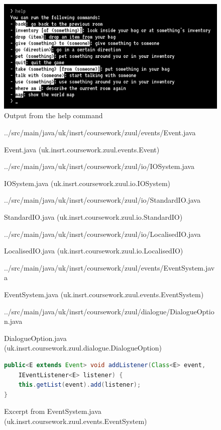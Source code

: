 \documentclass{article}
\begin{document}
    \begin{figure}
        \centering
        \includegraphics[width=\textwidth]{images/help-command.jpg}
        \caption{Output from the help command} \label{fig:help-command}
    \end{figure}
    \begin{figure}
        
        {../src/main/java/uk/insrt/coursework/zuul/events/Event.java}
        \caption{Event.java (uk.insrt.coursework.zuul.events.Event)} \label{fig:event}
    \end{figure}
    \begin{figure}
        
        {../src/main/java/uk/insrt/coursework/zuul/io/IOSystem.java}
        \caption{IOSystem.java (uk.insrt.coursework.zuul.io.IOSystem)} \label{fig:io-system}
    \end{figure}
    \begin{figure}
        
        {../src/main/java/uk/insrt/coursework/zuul/io/StandardIO.java}
        \caption{StandardIO.java (uk.insrt.coursework.zuul.io.StandardIO)} \label{fig:standard-io}
    \end{figure}
    \begin{figure}
        
        {../src/main/java/uk/insrt/coursework/zuul/io/LocalisedIO.java}
        \caption{LocalisedIO.java (uk.insrt.coursework.zuul.io.LocalisedIO)} \label{fig:localised-io}
    \end{figure}
    \begin{figure}
        
        {../src/main/java/uk/insrt/coursework/zuul/events/EventSystem.java}
        \caption{EventSystem.java (uk.insrt.coursework.zuul.events.EventSystem)} \label{fig:event-system}
    \end{figure}
    \begin{figure}
        
        {../src/main/java/uk/insrt/coursework/zuul/dialogue/DialogueOption.java}
        \caption{DialogueOption.java (uk.insrt.coursework.zuul.dialogue.DialogueOption)} \label{fig:dialogue}
    \end{figure}
    \begin{figure}
        \begin{lstlisting}[language=Java]
public<E extends Event> void addListener(Class<E> event,
    IEventListener<E> listener) {
    this.getList(event).add(listener);
}\end{lstlisting}
        \caption{Excerpt from EventSystem.java (uk.insrt.coursework.zuul.events.EventSystem)} \label{fig:generic-method}
    \end{figure}
\end{document}

